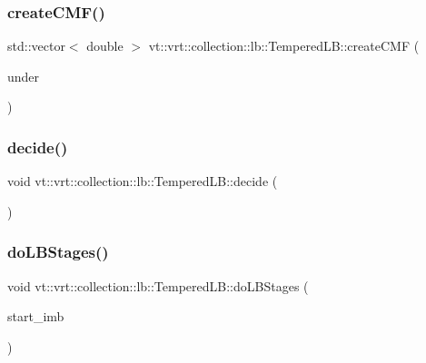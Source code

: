 \subsubsection{\texorpdfstring{create\+C\+M\+F()}{createCMF()}}
{\footnotesize\ttfamily std\+::vector$<$ double $>$ vt\+::vrt\+::collection\+::lb\+::\+Tempered\+L\+B\+::create\+C\+MF (\begin{DoxyParamCaption}\item[{\hyperlink{structvt_1_1vrt_1_1collection_1_1lb_1_1_tempered_l_b_aa18a0edaf10119e307e7209371caa673}{Node\+Set\+Type} const \&}]{under }\end{DoxyParamCaption})\hspace{0.3cm}{\ttfamily [protected]}}

\mbox{\label{structvt_1_1vrt_1_1collection_1_1lb_1_1_tempered_l_b_a099523e70a588de77eec53a36aeeecdf}} 
\subsubsection{\texorpdfstring{decide()}{decide()}}
{\footnotesize\ttfamily void vt\+::vrt\+::collection\+::lb\+::\+Tempered\+L\+B\+::decide (\begin{DoxyParamCaption}{ }\end{DoxyParamCaption})\hspace{0.3cm}{\ttfamily [protected]}}

\mbox{\label{structvt_1_1vrt_1_1collection_1_1lb_1_1_tempered_l_b_a58a690f2c7b0d7dd7d0911bad176face}} 
\subsubsection{\texorpdfstring{do\+L\+B\+Stages()}{doLBStages()}}
{\footnotesize\ttfamily void vt\+::vrt\+::collection\+::lb\+::\+Tempered\+L\+B\+::do\+L\+B\+Stages (\begin{DoxyParamCaption}\item[{\hyperlink{namespacevt_a8fb51741340b87d7aaee0bef60e9896b}{Load\+Type}}]{start\+\_\+imb }\end{DoxyParamCaption})\hspace{0.3cm}{\ttfamily [protected]}}

